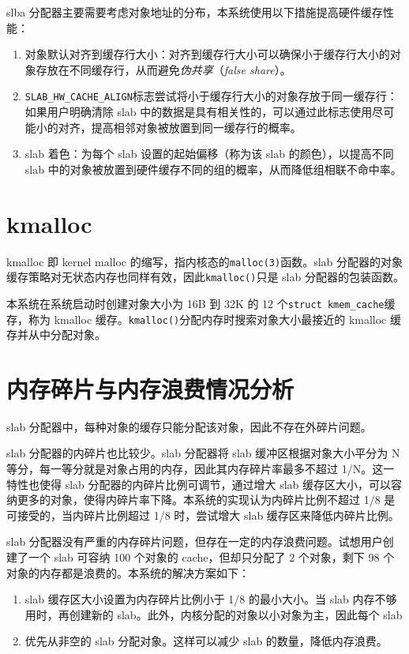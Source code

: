 \documentclass[AutoFakeBold]{LZUThesis}
\begin{document}
\begin{sloppypar}
slba
分配器主要需要考虑对象地址的分布，本系统使用以下措施提高硬件缓存性能：

\begin{enumerate}
\def\labelenumi{\arabic{enumi}.}
\item
  对象默认对齐到缓存行大小：对齐到缓存行大小可以确保小于缓存行大小的对象存放在不同缓存行，从而避免\emph{伪共享}（\emph{false
  share}）。
\item
  \texttt{SLAB\_HW\_CACHE\_ALIGN}标志尝试将小于缓存行大小的对象存放于同一缓存行：如果用户明确清除
  slab
  中的数据是具有相关性的，可以通过此标志使用尽可能小的对齐，提高相邻对象被放置到同一缓存行的概率。
\item
  slab 着色：为每个 slab 设置的起始偏移（称为该 slab
  的颜色），以提高不同 slab
  中的对象被放置到硬件缓存不同的组的概率，从而降低组相联不命中率。
\end{enumerate}


\section{kmalloc}

kmalloc 即 kernel malloc 的缩写，指内核态的\texttt{malloc(3)}函数。slab
分配器的对象缓存策略对无状态内存也同样有效，因此\texttt{kmalloc()}只是
slab 分配器的包装函数。

本系统在系统启动时创建对象大小为 16B 到 32K 的 12
个\texttt{struct\ kmem\_cache}缓存，称为 kmalloc
缓存。\texttt{kmalloc()}分配内存时搜索对象大小最接近的 kmalloc
缓存并从中分配对象。


\section{内存碎片与内存浪费情况分析}

slab 分配器中，每种对象的缓存只能分配该对象，因此不存在外碎片问题。

slab 分配器的内碎片也比较少。slab 分配器将 slab 缓冲区根据对象大小平分为
N 等分，每一等分就是对象占用的内存，因此其内存碎片率最多不超过
1/N。这一特性也使得 slab 分配器的内碎片比例可调节，通过增大 slab
缓存区大小，可以容纳更多的对象，使得内碎片率下降。本系统的实现认为内碎片比例不超过
1/8 是可接受的，当内碎片比例超过 1/8 时，尝试增大 slab
缓存区来降低内碎片比例。

slab
分配器没有严重的内存碎片问题，但存在一定的内存浪费问题。试想用户创建了一个
slab 可容纳 100 个对象的 cache，但却只分配了 2 个对象，剩下 98
个对象的内存都是浪费的。本系统的解决方案如下：

\begin{enumerate}
\def\labelenumi{\arabic{enumi}.}
\item
  slab 缓存区大小设置为内存碎片比例小于 1/8 的最小大小。当 slab
  内存不够用时，再创建新的
  slab。此外，内核分配的对象以小对象为主，因此每个 slab
\item
  优先从非空的 slab 分配对象。这样可以减少 slab 的数量，降低内存浪费。
\end{enumerate}


\end{sloppypar}
\end{document}
